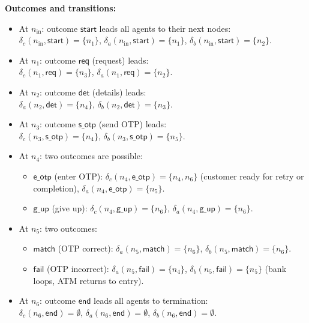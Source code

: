 \textbf{Outcomes and transitions:}
\begin{itemize}
\item At $n_{\text{in}}$: outcome $\mathsf{start}$ leads all agents to their next nodes: \\
$\delta_c(n_{\text{in}}, \mathsf{start}) = \{n_1\}$, $\delta_a(n_{\text{in}}, \mathsf{start}) = \{n_1\}$, $\delta_b(n_{\text{in}}, \mathsf{start}) = \{n_2\}$.

\item At $n_1$: outcome $\mathsf{req}$ (request) leads: \\
$\delta_c(n_1, \mathsf{req}) = \{n_3\}$, $\delta_a(n_1, \mathsf{req}) = \{n_2\}$.

\item At $n_2$: outcome $\mathsf{det}$ (details) leads: \\
$\delta_a(n_2, \mathsf{det}) = \{n_4\}$, $\delta_b(n_2, \mathsf{det}) = \{n_3\}$.

\item At $n_3$: outcome $\mathsf{s\_otp}$ (send OTP) leads: \\
$\delta_c(n_3, \mathsf{s\_otp}) = \{n_4\}$, $\delta_b(n_3, \mathsf{s\_otp}) = \{n_5\}$.

\item At $n_4$: two outcomes are possible:
\begin{itemize}
\item $\mathsf{e\_otp}$ (enter OTP): $\delta_c(n_4, \mathsf{e\_otp}) = \{n_4, n_6\}$ (customer ready for retry or completion), $\delta_a(n_4, \mathsf{e\_otp}) = \{n_5\}$.
\item $\mathsf{g\_up}$ (give up): $\delta_c(n_4, \mathsf{g\_up}) = \{n_6\}$, $\delta_a(n_4, \mathsf{g\_up}) = \{n_6\}$.
\end{itemize}

\item At $n_5$: two outcomes:
\begin{itemize}
\item $\mathsf{match}$ (OTP correct): $\delta_a(n_5, \mathsf{match}) = \{n_6\}$, $\delta_b(n_5, \mathsf{match}) = \{n_6\}$.
\item $\mathsf{fail}$ (OTP incorrect): $\delta_a(n_5, \mathsf{fail}) = \{n_4\}$, $\delta_b(n_5, \mathsf{fail}) = \{n_5\}$ (bank loops, ATM returns to entry).
\end{itemize}

\item At $n_6$: outcome $\mathsf{end}$ leads all agents to termination: \\
$\delta_c(n_6, \mathsf{end}) = \emptyset$, $\delta_a(n_6, \mathsf{end}) = \emptyset$, $\delta_b(n_6, \mathsf{end}) = \emptyset$.
\end{itemize}

